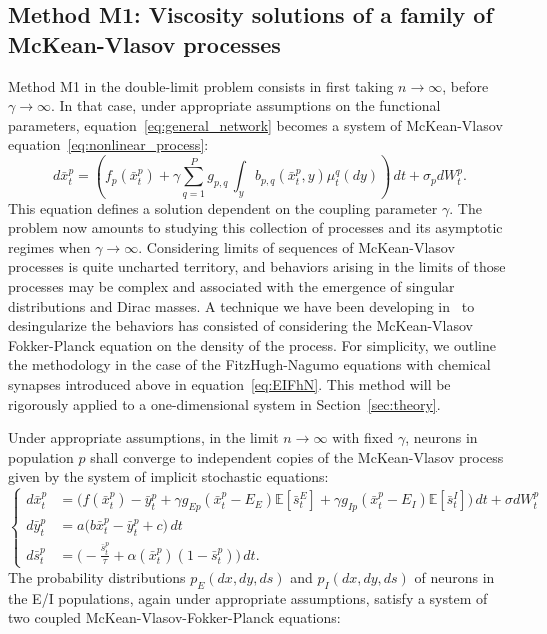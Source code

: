 \documentclass[onefignum,onetabnum]{siamart190516}
\newcommand{\1}{\mathbbm{1}}
\newcommand{\review}[1]{\textcolor{midblue}{ #1}}
\renewcommand{\review}[1]{{ #1}}
\begin{document}
\subsection{Method M1: Viscosity solutions of a family of McKean-Vlasov processes}\label{sec:methodHeuristic}
\review{Method M1 in the double-limit problem consists in first taking $n\to \infty$, before $\gamma\to \infty$. In that case, under appropriate assumptions on the functional parameters, equation~\eqref{eq:general_network} becomes a system of McKean-Vlasov equation~\eqref{eq:nonlinear_process}:
\begin{equation}
d\bar{x}_t^{p} = \left(f_p(\bar x_t^p)+\gamma \sum_{q=1}^P g_{p,q}\,\int_{y} b_{p,q}(\bar x_t^p,y)\mu_t^q(dy) \right)\,dt+ \sigma_p dW^p_t.
\end{equation}
This equation defines a solution dependent on the coupling parameter $\gamma$. The problem now amounts to studying this collection of processes and its asymptotic regimes when $\gamma\to\infty$. Considering limits of sequences of McKean-Vlasov processes is quite uncharted territory, and behaviors arising in the limits of those processes may be complex and associated with the emergence of singular distributions and Dirac masses. A technique we have been developing in~\cite{quininao2020clamping} to desingularize the behaviors has consisted of considering the McKean-Vlasov Fokker-Planck equation on the density of the process. For simplicity, we outline the methodology in the case of the FitzHugh-Nagumo equations with chemical synapses introduced above in equation~\eqref{eq:EIFhN}. This method will be rigorously applied to a one-dimensional system in Section~\ref{sec:theory}. }


\review{Under appropriate assumptions, in the limit $n\to \infty$ with fixed $\gamma$, neurons in population $p$ shall converge to independent copies of the McKean-Vlasov process given by the system of implicit stochastic equations:
\begin{equation}\label{eq:EIFhNMcKeanVlasov}
		\begin{cases}
			d\bar{x}^p_t&=\displaystyle{\Big(f(\bar{x}^p_t)-\bar{y}^p_t+\gamma g_{Ep} (\bar{x}^p_t-E_{E}) \mathbb{E}[\bar{s}^E_t]+\gamma g_{Ip} (\bar{x}^p_t-E_{I}) \mathbb{E}[\bar{s}^I_t]\Big)\,dt +\sigma dW^p_t}\\
			d\bar{y}^p_t&=a\Big(b\bar{x}^p_t-\bar{y}^p_t+c\Big)\,dt\\
			d\bar{s}^{p}_t&=\Big(-\frac{\bar{s}^{p}_t}{\tau}+\alpha(\bar{x}^p_t)(1-\bar{s}^{p}_t)\Big)\,dt.
		\end{cases}
	\end{equation}
The probability distributions $p_E(dx,dy,ds)$ and $p_I(dx,dy,ds)$ of neurons in the E/I populations, again under appropriate assumptions, satisfy a system of two coupled McKean-Vlasov-Fokker-Planck equations:}
\end{document}
